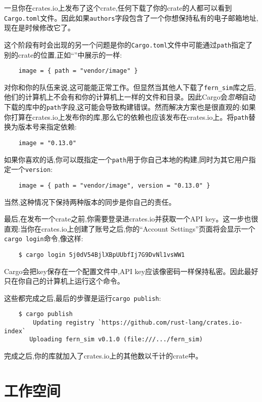 \begin{note}
    一旦你在crates.io上发布了这个crate,任何下载了你的crate的人都可以看到\texttt{Cargo.toml}文件。因此如果\texttt{authors}字段包含了一个你想保持私有的电子邮箱地址,现在是时候修改它了。
\end{note}

这个阶段有时会出现的另一个问题是你的\texttt{Cargo.toml}文件中可能通过\texttt{path}指定了别的crate的位置,正如“”中展示的一样:
\begin{verbatim}
    image = { path = "vendor/image" }
\end{verbatim}

对你和你的队伍来说,这可能能正常工作。但显然当其他人下载了\texttt{fern\_sim}库之后,他们的计算机上不会有和你的计算机上一样的文件和目录。因此Cargo会\emph{忽略}自动下载的库中的\texttt{path}字段,这可能会导致构建错误。然而解决方案也是很直观的:如果你打算在crates.io上发布你的库,那么它的依赖也应该发布在crates.io上。将\texttt{path}替换为版本号来指定依赖:
\begin{verbatim}
    image = "0.13.0"
\end{verbatim}

如果你喜欢的话,你可以既指定一个\texttt{path}用于你自己本地的构建,同时为其它用户指定一个\texttt{version}:
\begin{verbatim}
    image = { path = "vendor/image", version = "0.13.0" }
\end{verbatim}

当然,这种情况下保持两种版本的同步是你自己的责任。

最后,在发布一个crate之前,你需要登录进crates.io并获取一个API key。这一步也很直观:当你在crates.io上创建了账号之后,你的“Account Settings”页面将会显示一个\texttt{cargo login}命令,像这样:
\begin{verbatim}
    $ cargo login 5j0dV54BjlXBpUUbfIj7G9DvNl1vsWW1
\end{verbatim}

Cargo会把key保存在一个配置文件中,API key应该像密码一样保持私密。因此最好只在你自己的计算机上运行这个命令。

这些都完成之后,最后的步骤是运行\texttt{cargo publish}:
\begin{verbatim}
    $ cargo publish
        Updating registry `https://github.com/rust-lang/crates.io-index`
       Uploading fern_sim v0.1.0 (file:///.../fern_sim)
\end{verbatim}

完成之后,你的库就加入了crates.io上的其他数以千计的crate中。

\section{工作空间}

